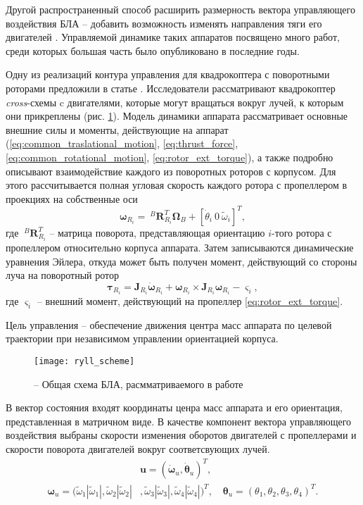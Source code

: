 Другой распространенный способ расширить размерность вектора управляющего воздействия БЛА -- добавить возможность изменять направления тяги его двигателей \cite{Papachristos01, Gupta01, Lin01, Dharmawan01}. Управляемой динамике таких аппаратов посвящено много работ, среди которых большая часть было опубликовано в последние годы.

Одну из реализаций контура управления для квадрокоптера с поворотными роторами предложили в статье \cite{Ryll01}. Исследователи рассматривают квадрокоптер \textit{cross}-схемы c двигателями, которые могут вращаться вокруг лучей, к которым они прикреплены (рис. \ref{fig:ryll_scheme}). Модель динамики аппарата рассматривает основные внешние силы и моменты, действующие на аппарат (\ref{eq:common_traslational_motion}, \ref{eq:thrust_force}, \ref{eq:common_rotational_motion}, \ref{eq:rotor_ext_torque}), а также подробно описывают взаимодействие каждого из поворотных роторов с корпусом. Для этого рассчитывается полная угловая скорость каждого ротора с пропеллером в проекциях на собственные оси
\begin{equation}
\bm{\omega}_{R_i} = ~^B\bm{R}_{R_i}^T \bm \Omega_B + [\dot{\theta}_i \ 0 \ \tilde \omega_i]^T,
\end{equation}
где $~^B\bm{R}_{R_i}^T$ -- матрица поворота, представляющая ориентацию $i$-того ротора с пропеллером
относительно корпуса аппарата.
Затем записываются динамические уравнения Эйлера, откуда может быть получен момент, действующий со стороны луча на поворотный ротор
\begin{equation}
\bm{\tau}_{R_i} = \bm J_{R_i} \dot{\bm \omega}_{R_i} +
{\bm \omega}_{R_i} \times \bm J_{R_i} {\bm \omega}_{R_i} - \bm \varsigma_i,
\end{equation}
где $\bm \varsigma_i$ -- внешний момент, действующий на пропеллер \eqref{eq:rotor_ext_torque}.

Цель управления -- обеспечение движения центра масс аппарата по целевой траектории при независимом управлении ориентацией корпуса. 
\begin{figure}[h!]
	\centering
	\texttt{[image: ryll\_scheme]}
	\caption{ -- Общая схема БЛА, расмматриваемого в работе \cite{Ryll01}}
 	\label{fig:ryll_scheme}
\end{figure}

В вектор состояния входят координаты ценра масс аппарата и его ориентация, представленная в матричном виде.
В качестве компонент вектора управляющего воздействия выбраны скорости изменения оборотов двигателей с пропеллерами и скорости поворота двигателей вокруг соответсвующих лучей.
\begin{equation} \label{eq:ryll_ctrl_out}
\begin{aligned}
&\bm{u} = (\dot{\bm \omega}_u,  \dot{\bm \theta}_u)^T,
\\
\bm \omega_u =
(\tilde\omega_1 |\tilde\omega_1|,
\tilde\omega_2 |\tilde\omega_2|&,
\tilde\omega_3 |\tilde\omega_3|,
\tilde\omega_4 |\tilde\omega_4|)^T,
\quad
{\bm \theta}_u = (\theta_1, \theta_2 , \theta_3 , \theta_4 )^T.
\end{aligned}
\end{equation}

